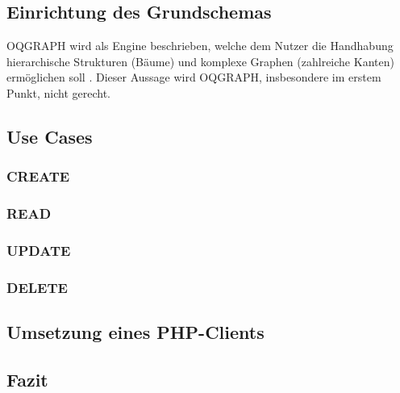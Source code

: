 \subsection{Einrichtung des Grundschemas}
OQGRAPH wird als Engine beschrieben, welche dem Nutzer die Handhabung hierarchische Strukturen (Bäume) und komplexe Graphen (zahlreiche Kanten) ermöglichen soll \cite{oqgraph}. Dieser Aussage wird OQGRAPH, insbesondere im erstem Punkt, nicht gerecht. 



\subsection{Use Cases}
\subsubsection{CREATE}
\subsubsection{READ}
\subsubsection{UPDATE}
\subsubsection{DELETE}
\subsection{Umsetzung eines PHP-Clients}
\subsection{Fazit}

